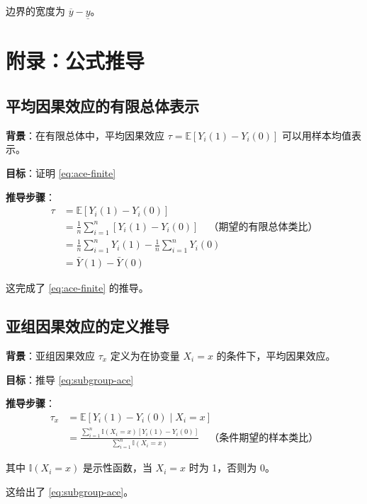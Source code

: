边界的宽度为 $\overline{y} - \underline{y}$。


\section{附录：公式推导}\label{sec:appendix-chapter2}

\subsection{平均因果效应的有限总体表示}\label{sec:appendix-ace-finite-sample}

\textbf{背景}：在有限总体中，平均因果效应 $\tau = \mathbb{E}[Y_i(1) - Y_i(0)]$ 可以用样本均值表示。

\textbf{目标}：证明 \cref{eq:ace-finite}

\textbf{推导步骤}：
\begin{align}
\tau &= \mathbb{E}[Y_i(1) - Y_i(0)] \\
&= \frac{1}{n} \sum_{i=1}^n [Y_i(1) - Y_i(0)] \quad \text{（期望的有限总体类比）} \\
&= \frac{1}{n} \sum_{i=1}^n Y_i(1) - \frac{1}{n} \sum_{i=1}^n Y_i(0) \\
&= \bar{Y}(1) - \bar{Y}(0)
\end{align}

这完成了 \cref{eq:ace-finite} 的推导。

\subsection{亚组因果效应的定义推导}\label{sec:appendix-subgroup-ace}

\textbf{背景}：亚组因果效应 $\tau_x$ 定义为在协变量 $X_i = x$ 的条件下，平均因果效应。

\textbf{目标}：推导 \cref{eq:subgroup-ace}

\textbf{推导步骤}：
\begin{align}
\tau_x &= \mathbb{E}[Y_i(1) - Y_i(0) \mid X_i = x] \\
&= \frac{\sum_{i=1}^n \mathbb{I}(X_i = x) [Y_i(1) - Y_i(0)]}{\sum_{i=1}^n \mathbb{I}(X_i = x)} \quad \text{（条件期望的样本类比）}
\end{align}

其中 $\mathbb{I}(X_i = x)$ 是示性函数，当 $X_i = x$ 时为 1，否则为 0。

这给出了 \cref{eq:subgroup-ace}。

